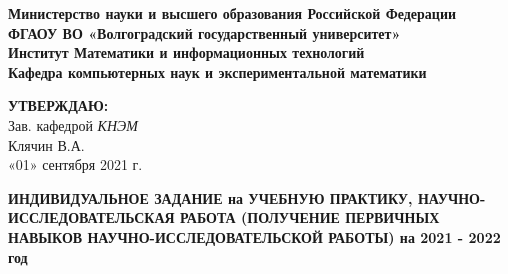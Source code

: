 \documentclass[12pt,a4paper]{scrartcl}
\begin{document}
	
	\phantom{fake text for spacing}
	\begin{center}
		\textbf{Министерство науки и высшего образования Российской Федерации} \\
		\textbf{ФГАОУ ВО «Волгоградский государственный университет»} \\
		\textbf{Институт Математики и информационных технологий} \\
		\textbf{Кафедра компьютерных наук и экспериментальной математики} \\
		
		\vspace{0.6cm}
		
		\hfill\begin{minipage}{0.4\textwidth}
		\begin{flushright}
			\textbf{\textsc{УТВЕРЖДАЮ:}} \\
			Зав. кафедрой \textit{КНЭМ} \\
			Клячин В.А.\\
			«01» сентября 2021 г.
		\end{flushright}
		\end{minipage}
		
		\vspace{0.6cm}
		
		\textbf{
			ИНДИВИДУАЛЬНОЕ ЗАДАНИЕ на УЧЕБНУЮ ПРАКТИКУ, НАУЧНО-ИССЛЕДОВАТЕЛЬСКАЯ РАБОТА (ПОЛУЧЕНИЕ ПЕРВИЧНЫХ НАВЫКОВ НАУЧНО-ИССЛЕДОВАТЕЛЬСКОЙ РАБОТЫ)
			на 2021 - 2022 год
			\vspace{0.2cm}
		}
		
		\vspace{0.3cm}
		\renewcommand{\arraystretch}{1.5} %
		

\end{center}
\end{document}
